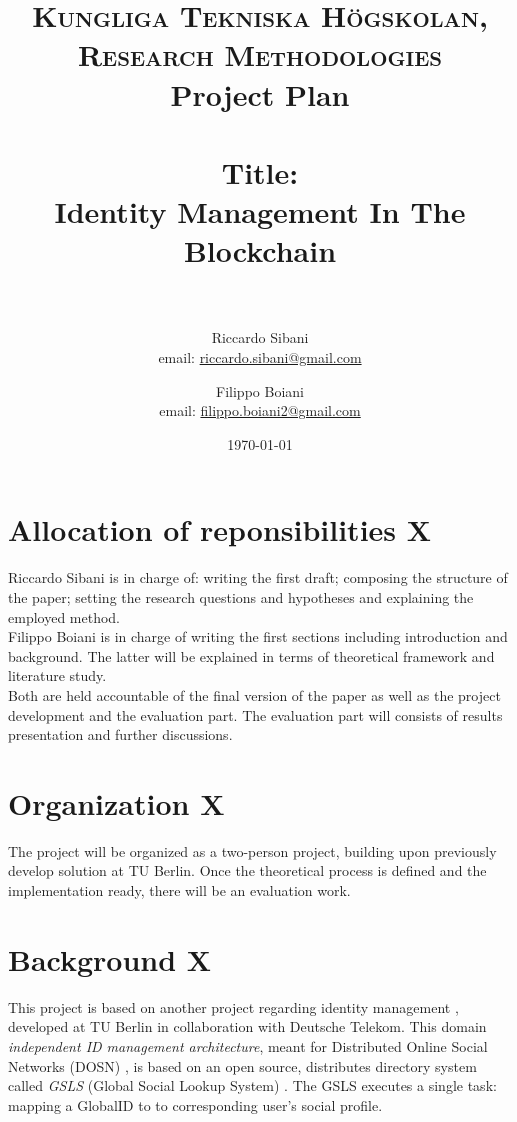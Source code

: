 \documentclass[paper=a4, fontsize=11pt]{scrartcl} %
\title{
\normalfont \normalsize
\textsc{Kungliga Tekniska Högskolan, Research Methodologies} \\ [10pt] %
Project Plan \\ [16pt]
\horrule{0.5pt} \\[0.5pt] %
\huge Title:\\Identity Management In The Blockchain \\ %
\vspace{5mm}
\horrule{1pt} \\[0.5cm] %
}
\author{Riccardo Sibani \\ email: \href{mailto:riccardo.sibani@gmail.com}{riccardo.sibani@gmail.com}
   \and Filippo Boiani \\ email: \href{mailto:filippo.boiani2@gmail.com}{filippo.boiani2@gmail.com} } %
\date{\normalsize\today} %
\numberwithin{equation}{section} %
\numberwithin{figure}{section} %
\numberwithin{table}{section} %
\begin{document}
\maketitle %


\section{Allocation of reponsibilities X}
Riccardo Sibani is in charge of: writing the first draft; composing the structure of the paper; setting the research questions and hypotheses and explaining the employed method.
\\

Filippo Boiani is in charge of writing the first sections including introduction and background. The latter will be explained in terms of theoretical framework and literature study. 
\\

Both are held accountable of the final version of the paper as well as the project development and the evaluation part. The evaluation part will consists of results presentation and further discussions. 

\section{Organization X}
The project will be organized as a two-person project, building upon previously develop solution at TU Berlin. Once the theoretical process is defined and the implementation ready, there will be an evaluation work.

\section{Background X}
This project is based on another project regarding identity management \cite{identityMgmt2003} \cite{gondor2016distributed}, developed at TU Berlin in collaboration with Deutsche Telekom. This domain \textit{independent ID management architecture}, meant for Distributed Online Social Networks (DOSN) \cite{gondor2014sonic}, is based on an open source, distributes directory system called \textit{GSLS} (Global Social Lookup System) \cite{gondor2016distributed}. The GSLS executes a single task: mapping a GlobalID to to corresponding user's social profile. 
\end{document}
